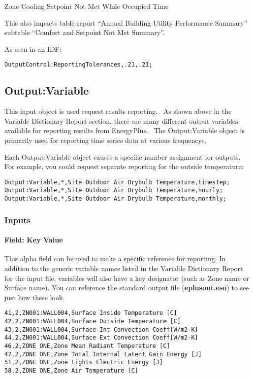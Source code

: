 Zone Cooling Setpoint Not Met While Occupied Time

This also impacts table report ``Annual Building Utility Performance Summary'' subtable ``Comfort and Setpoint Not Met Summary''.

As seen in an IDF:

\begin{lstlisting}
OutputControl:ReportingTolerances,.21,.21;
\end{lstlisting}

\subsection{Output:Variable}\label{outputvariable}

This input object is used request results reporting.~ As shown above in the Variable Dictionary Report section, there are many different output variables available for reporting results from EnergyPlus.~ The Output:Variable object is primarily used for reporting time series data at various frequencys.

Each Output:Variable object causes a specific number assignment for outputs. For example, you could request separate reporting for the outside temperature:

\begin{lstlisting}
Output:Variable,*,Site Outdoor Air Drybulb Temperature,timestep;
Output:Variable,*,Site Outdoor Air Drybulb Temperature,hourly;
Output:Variable,*,Site Outdoor Air Drybulb Temperature,monthly;
\end{lstlisting}

\subsubsection{Inputs}\label{inputs-8-019}

\paragraph{Field: Key Value}\label{field-key-value}

This alpha field can be used to make a specific reference for reporting. In addition to the generic variable names listed in the Variable Dictionary Report for the input file, variables will also have a key designator (such as Zone name or Surface name). You can reference the standard output file (\textbf{eplusout.eso}) to see just how these look.

\begin{lstlisting}
41,2,ZN001:WALL004,Surface Inside Temperature [C]
42,2,ZN001:WALL004,Surface Outside Temperature [C]
43,2,ZN001:WALL004,Surface Int Convection Coeff[W/m2-K]
44,2,ZN001:WALL004,Surface Ext Convection Coeff[W/m2-K]
46,2,ZONE ONE,Zone Mean Radiant Temperature [C]
47,2,ZONE ONE,Zone Total Internal Latent Gain Energy [J]
51,2,ZONE ONE,Zone Lights Electric Energy [J]
58,2,ZONE ONE,Zone Air Temperature [C]
\end{lstlisting}

